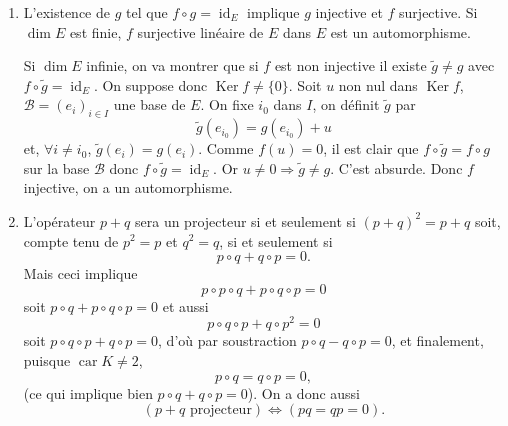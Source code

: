 \begin{enumerate}[label=\arabic*.,leftmargin=2.2em,itemsep=1.1em]
Détermination de $f$ : sur $]-\infty,x_1[$ : $f(x)$ est du type $ax^2+bx+c$, (3 coefficients), sur $]x_1,x_2[$, $f(x)$ est du type $a_1x^2+b_1x+c_1$ et la classe $C^1$ exige les égalités
\[
(a-a_1)x_1^2+(b-b_1)x_1+c-c_1=0,
\]
\[
2(a-a_1)x_1+b-b_1=0.
\]
C'est un système de 2 équations à 3 inconnues, $(a-a_1,b-b_1,c-c_1)$, homogène de rang 2, (matrice
\[
\begin{pmatrix}
x_1^2&x_1&1\\
2x_1&1&0
\end{pmatrix}
\]
avec $\left|\begin{smallmatrix}x_1&1\\1&0\end{smallmatrix}\right|=-1$).

Les solutions forment un espace vectoriel de dimension 1. On se donne par exemple $a_1$, et $b_1$ et $c_1$ deviennent fonctions linéaires de $a,b,c,a_1$. On fait de même en chaque $x_i$, d'où un paramètre indépendant de plus et $\dim E=n+3$.

Soit $f_i$ définie par $f_i(x)=(x-x_i)^2$ sur $]-\infty,x_i[$, 0 sur $[x_i,+\infty[$. Les fonctions $1,x,x^2,f_1,f_2,\ldots,f_n$ sont indépendantes, (à vérifier) dans $E$, en nombre $n+3$ : on a une base de $E$.

\item L'existence de $g$ tel que $f\circ g=\operatorname{id}_E$ implique $g$ injective et $f$ surjective. Si $\dim E$ est finie, $f$ surjective linéaire de $E$ dans $E$ est un automorphisme.

Si $\dim E$ infinie, on va montrer que si $f$ est non injective il existe $\widetilde g\ne g$ avec $f\circ\widetilde g=\operatorname{id}_E$. On suppose donc $\operatorname{Ker} f\ne\{0\}$. Soit $u$ non nul dans $\operatorname{Ker} f$, $\mathcal B=(e_i)_{i\in I}$ une base de $E$. On fixe $i_0$ dans $I$, on définit $\widetilde g$ par
\[
\widetilde g(e_{i_0})=g(e_{i_0})+u
\]
et, $\forall i\ne i_0$, $\widetilde g(e_i)=g(e_i)$. Comme $f(u)=0$, il est clair que $f\circ\widetilde g=f\circ g$ sur la base $\mathcal B$ donc $f\circ\widetilde g=\operatorname{id}_E$. Or $u\ne0\Rightarrow\widetilde g\ne g$. C'est absurde. Donc $f$ injective, on a un automorphisme.

\item L'opérateur $p+q$ sera un projecteur si et seulement si $(p+q)^2=p+q$ soit, compte tenu de $p^2=p$ et $q^2=q$, si et seulement si
\[
p\circ q+q\circ p=0.
\]
Mais ceci implique
\[
p\circ p\circ q+p\circ q\circ p=0
\]
soit $p\circ q+p\circ q\circ p=0$ et aussi
\[
p\circ q\circ p+q\circ p^2=0
\]
soit $p\circ q\circ p+q\circ p=0$, d'où par soustraction $p\circ q-q\circ p=0$, et finalement, puisque $\operatorname{car}K\ne2$,
\[
p\circ q=q\circ p=0,
\]
(ce qui implique bien $p\circ q+q\circ p=0$). On a donc aussi
\[
(p+q\text{ projecteur})\Longleftrightarrow(pq=qp=0).
\]


\end{enumerate}
